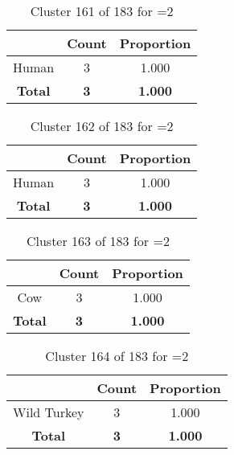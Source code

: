 \begin{table}[ht!]
\centering
\begin{tabular}{|c|c|c|}
\hline
\bf \Spec{} &\bf Count &\bf Proportion\\ \hline \hline
Human & 3 & 1.000\\ \hline
\hline
\bf Total & \bf 3 & \bf 1.000\\ \hline
\end{tabular}
\label{tab:cluster:161:2}
\caption{Cluster 161 of 183 for \minneigh{}=2}
\end{table}

\begin{table}[ht!]
\centering
\begin{tabular}{|c|c|c|}
\hline
\bf \Spec{} &\bf Count &\bf Proportion\\ \hline \hline
Human & 3 & 1.000\\ \hline
\hline
\bf Total & \bf 3 & \bf 1.000\\ \hline
\end{tabular}
\label{tab:cluster:162:2}
\caption{Cluster 162 of 183 for \minneigh{}=2}
\end{table}

\begin{table}[ht!]
\centering
\begin{tabular}{|c|c|c|}
\hline
\bf \Spec{} &\bf Count &\bf Proportion\\ \hline \hline
Cow & 3 & 1.000\\ \hline
\hline
\bf Total & \bf 3 & \bf 1.000\\ \hline
\end{tabular}
\label{tab:cluster:163:2}
\caption{Cluster 163 of 183 for \minneigh{}=2}
\end{table}

\begin{table}[ht!]
\centering
\begin{tabular}{|c|c|c|}
\hline
\bf \Spec{} &\bf Count &\bf Proportion\\ \hline \hline
Wild Turkey & 3 & 1.000\\ \hline
\hline
\bf Total & \bf 3 & \bf 1.000\\ \hline
\end{tabular}
\label{tab:cluster:164:2}
\caption{Cluster 164 of 183 for \minneigh{}=2}
\end{table}

